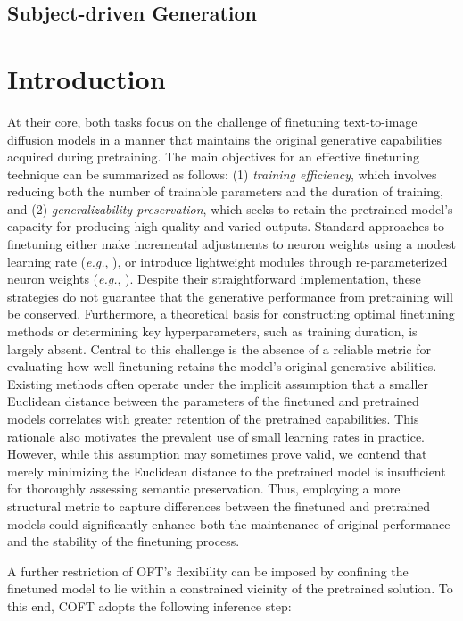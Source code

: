 \subsection{Subject-driven Generation}

\section{Introduction}

At their core, both tasks focus on the challenge of finetuning text-to-image diffusion models in a manner that maintains the original generative capabilities acquired during pretraining. The main objectives for an effective finetuning technique can be summarized as follows: (1) \emph{training efficiency}, which involves reducing both the number of trainable parameters and the duration of training, and (2) \emph{generalizability preservation}, which seeks to retain the pretrained model’s capacity for producing high-quality and varied outputs. Standard approaches to finetuning either make incremental adjustments to neuron weights using a modest learning rate (\emph{e.g.}, \cite{ruiz2023dreambooth}), or introduce lightweight modules through re-parameterized neuron weights (\emph{e.g.}, \cite{hulora2022,zhang2023adding}). Despite their straightforward implementation, these strategies do not guarantee that the generative performance from pretraining will be conserved. Furthermore, a theoretical basis for constructing optimal finetuning methods or determining key hyperparameters, such as training duration, is largely absent. Central to this challenge is the absence of a reliable metric for evaluating how well finetuning retains the model's original generative abilities. Existing methods often operate under the implicit assumption that a smaller Euclidean distance between the parameters of the finetuned and pretrained models correlates with greater retention of the pretrained capabilities. This rationale also motivates the prevalent use of small learning rates in practice. However, while this assumption may sometimes prove valid, we contend that merely minimizing the Euclidean distance to the pretrained model is insufficient for thoroughly assessing semantic preservation. Thus, employing a more structural metric to capture differences between the finetuned and pretrained models could significantly enhance both the maintenance of original performance and the stability of the finetuning process.

A further restriction of OFT's flexibility can be imposed by confining the finetuned model to lie within a constrained vicinity of the pretrained solution. To this end, COFT adopts the following inference step:

